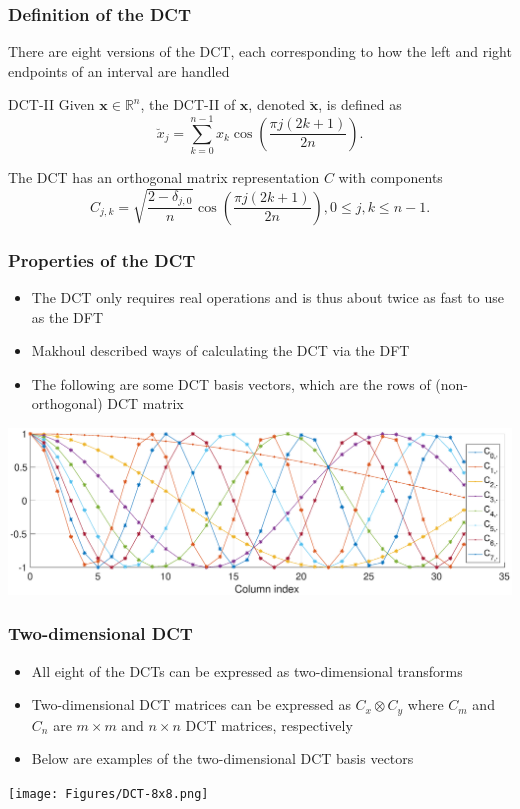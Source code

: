 \documentclass[t]{beamer}
\newcommand{\dct}[1]{\breve{#1}}	%
\begin{document}
\begin{frame}
\frametitle{Definition of the DCT}
There are eight versions of the DCT, each corresponding to how the left and right endpoints of an interval are handled \cite[p.~36-39]{GolubVanLoan2013}
\begin{block}{DCT-II}
Given $\mathbf{x} \in \mathbb{R}^n$, the DCT-II of $\mathbf{x}$, denoted $\dct{\mathbf{x}}$, is defined as
\[\dct{x}_j = \sum_{k=0}^{n-1} x_k\cos\left(\frac{\pi{j}(2k + 1)}{2n}\right).\]
\end{block}
The DCT has an orthogonal matrix representation $C$ with components
\[C_{j,k} = \sqrt{\frac{2 - \delta_{j,0}}{n}} \cos\left(\frac{\pi{j}(2k + 1)}{2n}\right), 0 \leq j,k \leq n-1.\]
\end{frame}

\begin{frame}
\frametitle{Properties of the DCT}
\begin{itemize}[nosep]
\item The DCT only requires real operations and is thus about twice as fast to use as the DFT \cite{RaoYip2014} 
\item Makhoul \cite{Makhoul1980} described ways of calculating the DCT via the DFT
\item The following are some DCT basis vectors, which are the rows of (non-orthogonal) DCT matrix
\end{itemize}
\begin{center}
\includegraphics[scale=0.27]{Figures/DCT_Vectors.eps}
\end{center}
\end{frame}

\begin{frame}
\frametitle{Two-dimensional DCT}
  \begin{itemize}
   \item All eight of the DCTs can be expressed as two-dimensional transforms
   \item Two-dimensional DCT matrices can be expressed as $C_x \otimes C_y$ where $C_m$ and $C_n$ are $m \times m$ and $n \times n$ DCT matrices, respectively
   \item Below are examples of the two-dimensional DCT basis vectors
  \end{itemize}
 \begin{center}
  \texttt{[image: Figures/DCT-8x8.png]}
 \end{center}
\end{frame}
\end{document}
